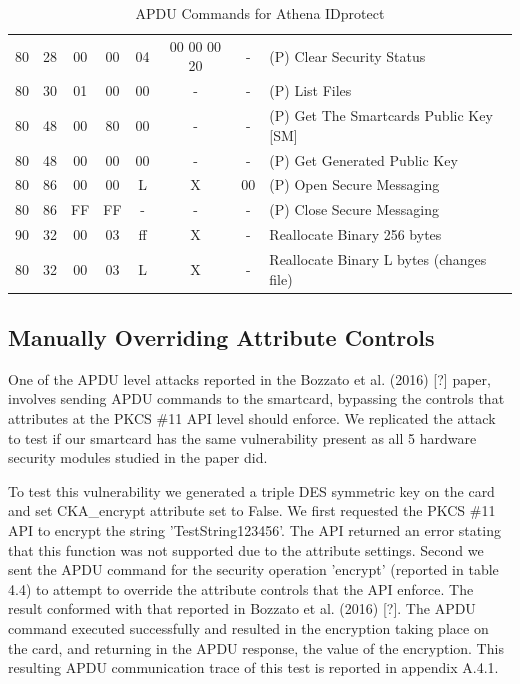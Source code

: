 \documentclass[bsc,frontabs,twoside,singlespacing,parskip,deptreport]{infthesis}     %
\begin{document}
\begin{table}[H]
\begin{tabular}{|c|c|c|c|c|c|c|p{8cm}|}
80  & 28  & 00 & 00 & 04  & 00 00 00 20& -  & (P) Clear Security Status\\
80  & 30  & 01 & 00 & 00  & -          & -  & (P) List Files\\
80  & 48  & 00 & 80 & 00  & -          & -  & (P) Get The Smartcards Public Key [SM]\\
80  & 48  & 00 & 00 & 00  & -          & -  & (P) Get Generated Public Key\\
80  & 86  & 00 & 00 & L   & X          & 00 & (P) Open Secure Messaging\\
80  & 86  & FF & FF & -   & -          & -  & (P) Close Secure Messaging\\
\hline
90  & 32  & 00 & 03 & ff  & X          & -  &  Reallocate Binary 256 bytes\\
80  & 32  & 00 & 03 & L   & X          & -  &  Reallocate Binary L bytes (changes file)\\
\hline
\end{tabular}
\caption{APDU Commands for Athena IDprotect}
\end{table} 


\subsection{Manually Overriding Attribute Controls}
One of the APDU level attacks reported in the Bozzato et al. (2016) [?] paper, involves sending APDU commands to the smartcard, bypassing the controls that attributes at the PKCS \#11 API level should enforce. We replicated the attack to test if our smartcard has the same vulnerability present as all 5 hardware security modules studied in the paper did. 

To test this vulnerability we generated a triple DES symmetric key on the card and set CKA\_encrypt attribute set to False. We first requested the PKCS \#11 API to encrypt the string 'TestString123456'. The API returned an error stating that this function was not supported due to the attribute settings. Second we sent the APDU command for the security operation 'encrypt' (reported in table 4.4) to attempt to override the attribute controls that the API enforce. The result conformed with that reported in Bozzato et al. (2016) [?]. The APDU command executed successfully and resulted in the encryption taking place on the card, and returning in the APDU response, the value of the encryption. This resulting APDU communication trace of this test is reported in appendix A.4.1.

\end{document}
